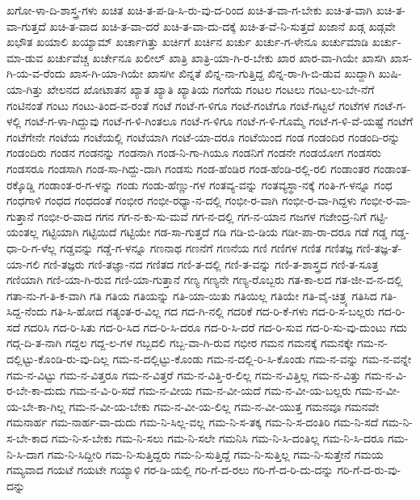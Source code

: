 {ಖಗೋ-ಳಾ-ದಿ-ಶಾಸ್ತ್ರ-ಗಳು
ಖಚಿತ
ಖಚಿ-ತ-ಪ-ಡಿ-ಸಿ-ರು-ವು-ದ-ರಿಂದ
ಖಚಿ-ತ-ವಾ-ಗ-ಬೇಕು
ಖಚಿ-ತ-ವಾಗಿ
ಖಚಿ-ತ-ವಾ-ಗುತ್ತದೆ
ಖಚಿ-ತ-ವಾದ
ಖಚಿ-ತ-ವಾ-ದರೆ
ಖಚಿ-ತ-ವಾ-ದು-ದಕ್ಕೆ
ಖಚಿ-ತ-ವೆ-ನಿ-ಸುತ್ತದೆ
ಖಜಾನೆ
ಖಡ್ಗ
ಖಡ್ಗವೇ
ಖಭೌತ
ಖಯಾಲಿ
ಖಯ್ಯಾಮ್
ಖರ್ಚಾಗಿತ್ತು
ಖರ್ಚಿಗೆ
ಖರ್ಚಿನ
ಖರ್ಚು
ಖರ್ಚು-ಗ-ಳೇನೂ
ಖರ್ಚುಮಾಡಿ
ಖರ್ಚು-ಮಾ-ಡುವ
ಖರ್ಚುವೆಚ್ಚ
ಖರ್ಚೇನೂ
ಖಲೀಲ್
ಖಾತ್ರಿ
ಖಾತ್ರಿ-ಯಾ-ಗಿ-ರ-ಬೇಕು
ಖಾರ
ಖಾರ-ವಾ-ಗಿಯೇ
ಖಾಸಗಿ
ಖಾಸ-ಗಿ-ಯ-ವ-ರೆಂದು
ಖಾಸ-ಗಿ-ಯಾ-ಗಿಯೇ
ಖಾಸಗೀ
ಖಿನ್ನತೆ
ಖಿನ್ನ-ನಾ-ಗುತ್ತಿದ್ದ
ಖಿನ್ನ-ರಾ-ಗಿ-ಬಿ-ಡುವ
ಖುದ್ದಾಗಿ
ಖುಷಿ-ಯಾ-ಗಿತ್ತು
ಖೇಲನದ
ಖೋಟಾತನ
ಖ್ಯಾತ
ಖ್ಯಾತಿ
ಖ್ಯಾತಿಯ
ಗಂಗೆಯ
ಗಂಟಲ
ಗಂಟಲು
ಗಂಟ-ಲು-ಬೇ-ನೆಗೆ
ಗಂಟಿನಂತೆ
ಗಂಟು
ಗಂಟು-ತಿಂದ-ವ-ರಂತೆ
ಗಂಟೆ
ಗಂಟೆ-ಗ-ಳಿಗೂ
ಗಂಟೆ-ಗಂಟೆಗೂ
ಗಂಟೆ-ಗಟ್ಟಲೆ
ಗಂಟೆಗಳ
ಗಂಟೆ-ಗ-ಳಲ್ಲಿ
ಗಂಟೆ-ಗ-ಳಾ-ಗಿದ್ದುವು
ಗಂಟೆ-ಗ-ಳಿ-ಗಿಂತಲೂ
ಗಂಟೆ-ಗ-ಳಿಗೂ
ಗಂಟೆ-ಗ-ಳಿ-ಗೊಮ್ಮೆ
ಗಂಟೆ-ಗ-ಳಿ-ವೆ-ಯಷ್ಟೆ
ಗಂಟೆಗೆ
ಗಂಟೆಗೇನೇ
ಗಂಟೆಯ
ಗಂಟೆಯಲ್ಲಿ
ಗಂಟೆಯಾಗಿ
ಗಂಟೆ-ಯಾ-ದರೂ
ಗಂಟೆಯಿಂದ
ಗಂಡ
ಗಂಡಂದಿರ
ಗಂಡಂದಿ-ರನ್ನು
ಗಂಡಂದಿರು
ಗಂಡನ
ಗಂಡನನ್ನು
ಗಂಡನಾಗಿ
ಗಂಡ-ನಿ-ಗಾ-ಗಿಯೂ
ಗಂಡನಿಗೆ
ಗಂಡನೇ
ಗಂಡಯೋಗ
ಗಂಡಸರು
ಗಂಡಸರೂ
ಗಂಡಸಾಗಿ
ಗಂಡ-ಸಾ-ಗಿದ್ದು-ದಾಗಿ
ಗಂಡಸು
ಗಂಡ-ಹೆಂಡಿರ
ಗಂಡ-ಹೆಂಡಿ-ರಲ್ಲಿ-ರಲಿ
ಗಂಡಾಂತರ
ಗಂಡಾಂತ-ರಕ್ಕೊಡ್ಡಿ
ಗಂಡಾಂತ-ರ-ಗ-ಳನ್ನು
ಗಂಡು
ಗಂಡು-ಹೆಣ್ಣು-ಗಳ
ಗಂತವ್ಯ-ವನ್ನು
ಗಂತವ್ಯಸ್ಥಾ-ನಕ್ಕೆ
ಗಂತಿ-ಗ-ಳನ್ನೂ
ಗಂಧ
ಗಂಧಗಾಳಿ
ಗಂಧದ
ಗಂಧದಂತೆ
ಗಂಭೀರ
ಗಂಭೀ-ರಧ್ಯಾ-ನ-ದಲ್ಲಿ
ಗಂಭೀ-ರ-ವಾಗಿ
ಗಂಭೀ-ರ-ವಾ-ಗಿದ್ದಳು
ಗಂಭೀ-ರ-ವಾ-ಗುತ್ತಾನೆ
ಗಂಭೀ-ರ-ವಾದ
ಗಗನ
ಗಗ-ನ-ಕು-ಸು-ಮವೆ
ಗಗ-ನ-ದಲ್ಲಿ
ಗಗ-ನ-ಯಾನ
ಗಜಗಳ
ಗಜೇಂದ್ರ-ನಿಗೆ
ಗಟ್ಟಿ-ಯಂತಲ್ಲ
ಗಟ್ಟಿಯಾಗಿ
ಗಟ್ಟಿಯಿದೆ
ಗಟ್ಟಿಯೇ
ಗಡ-ಸಾ-ಗುತ್ತದೆ
ಗಡಿ
ಗಡಿ-ಬಿ-ಡಿಯ
ಗಡೀ-ಪಾ-ರಾ-ದರೂ
ಗಡೆ
ಗಡ್ಡ
ಗಡ್ಡ-ಧಾ-ರಿ-ಗ-ಳೆಲ್ಲ
ಗಡ್ಡವನ್ನು
ಗಡ್ಡೆ-ಗ-ಳನ್ನೂ
ಗಣನಾಥ
ಗಣನೆಗೆ
ಗಣನೆಯ
ಗಣಿ
ಗಣಿಗಳ
ಗಣಿತ
ಗಣಿತಜ್ಞ
ಗಣಿ-ತಜ್ಞ-ತೆ-ಯಾ-ಗಲಿ
ಗಣಿ-ತಜ್ಞರು
ಗಣಿ-ತಜ್ಞಾ-ನದ
ಗಣಿತದ
ಗಣಿ-ತ-ದಲ್ಲಿ
ಗಣಿ-ತ-ವನ್ನು
ಗಣಿ-ತ-ಶಾಸ್ತ್ರದ
ಗಣಿ-ತ-ಸೂತ್ರ
ಗಣಿಯಾಗಿ
ಗಣಿ-ಯಾ-ಗಿ-ರುವ
ಗಣಿ-ಯಾ-ಗುತ್ತಾನೆ
ಗಣ್ಯ
ಗಣ್ಯನೇ
ಗಣ್ಯ-ರೊಬ್ಬರು
ಗತ-ಕಾ-ಲದ
ಗತ-ಜೀ-ವ-ನ-ದಲ್ಲಿ
ಗತಾ-ನು-ಗ-ತಿ-ಕ-ವಾಗಿ
ಗತಿ
ಗತಿಯ
ಗತಿಯನ್ನು
ಗತಿ-ಯಾ-ಯಿತು
ಗತಿಯಿಲ್ಲ
ಗತಿಯೇ
ಗತಿ-ವೈ-ಚಿತ್ರ್ಯ
ಗತಿಸಿದ
ಗತಿ-ಸಿದ್ದ-ನೆಂದು
ಗತಿ-ಸಿ-ಹೋದ
ಗತ್ಯಂತ-ರ-ವಿಲ್ಲ
ಗದ
ಗದ-ಗಿ-ನಲ್ಲಿ
ಗದರಿಕೆ
ಗದ-ರಿ-ಕೆ-ಗಳು
ಗದ-ರಿ-ಸ-ಬಲ್ಲರು
ಗದ-ರಿ-ಸದೆ
ಗದರಿಸಿ
ಗದ-ರಿ-ಸಿತು
ಗದ-ರಿ-ಸಿದ
ಗದ-ರಿ-ಸಿ-ದರೂ
ಗದ-ರಿ-ಸಿ-ದರೆ
ಗದ-ರಿ-ಸುವ
ಗದ-ರಿ-ಸು-ವು-ದುಂಟು
ಗದು
ಗದ್ಗ-ದಿ-ತ-ನಾಗಿ
ಗದ್ದಲ
ಗದ್ದ-ಲ-ಗಳ
ಗಬ್ಬದಲಿ
ಗಬ್ಬ-ವಾ-ಗಿ-ರುವ
ಗಭೀರ
ಗಮನ
ಗಮನಕ್ಕೆ
ಗಮನಕ್ಕೇ
ಗಮ-ನ-ದಲ್ಲಿಟ್ಟು-ಕೊಂಡಿ-ರು-ವು-ದಿಲ್ಲ
ಗಮ-ನ-ದಲ್ಲಿಟ್ಟು-ಕೊಂಡು
ಗಮ-ನ-ದಲ್ಲಿ-ರಿ-ಸಿ-ಕೊಂಡು
ಗಮ-ನ-ವನ್ನು
ಗಮ-ನ-ವನ್ನೇ
ಗಮ-ನ-ವಿಟ್ಟು
ಗಮ-ನ-ವಿತ್ತರೂ
ಗಮ-ನ-ವಿತ್ತರೆ
ಗಮ-ನ-ವಿತ್ತಿ-ರ-ಲಿಲ್ಲ
ಗಮ-ನ-ವಿತ್ತಿಲ್ಲ
ಗಮ-ನ-ವಿತ್ತು
ಗಮ-ನ-ವಿ-ರ-ಬೇ-ಕಾ-ದುದು
ಗಮ-ನ-ವಿ-ರಿ-ಸದೆ
ಗಮ-ನ-ವೀಯ
ಗಮ-ನ-ವೀ-ಯದೆ
ಗಮ-ನ-ವೀ-ಯ-ಬಲ್ಲರು
ಗಮ-ನ-ವೀ-ಯ-ಬೇ-ಕಾ-ಗಿಲ್ಲ
ಗಮ-ನ-ವೀ-ಯ-ಬೇಕು
ಗಮ-ನ-ವೀ-ಯ-ಲಿಲ್ಲ
ಗಮ-ನ-ವೀ-ಯುತ್ತ
ಗಮನವೂ
ಗಮನವೇ
ಗಮನಾರ್ಹ
ಗಮ-ನಾರ್ಹ-ವಾ-ದುದು
ಗಮ-ನಿ-ಸಿಲ್ಲ-ವಲ್ಲ
ಗಮ-ನಿ-ಸ-ತಕ್ಕ
ಗಮ-ನಿ-ಸ-ದಂತಿರಿ
ಗಮ-ನಿ-ಸದೆ
ಗಮ-ನಿ-ಸ-ಬೇ-ಕಾದ
ಗಮ-ನಿ-ಸ-ಬೇಕು
ಗಮ-ನಿ-ಸಲು
ಗಮ-ನಿ-ಸಲೇ
ಗಮನಿಸಿ
ಗಮ-ನಿ-ಸಿ-ದಂತಿಲ್ಲ
ಗಮ-ನಿ-ಸಿ-ದರೂ
ಗಮ-ನಿ-ಸಿ-ದಾಗ
ಗಮ-ನಿ-ಸಿದ್ದೀರಿ
ಗಮ-ನಿ-ಸುತ್ತಿದ್ದರು
ಗಮ-ನಿ-ಸುತ್ತಿದ್ದೆ
ಗಮ-ನಿ-ಸುತ್ತಿಲ್ಲ
ಗಮ-ನಿ-ಸುತ್ತೇನೆ
ಗಮಯ
ಗಮ್ಯವಾದ
ಗಯಟೆ
ಗಯಟೇ
ಗಯ್ಯಾಳಿ
ಗರ-ಡಿ-ಯಲ್ಲಿ
ಗರಿ-ಗೆ-ದ-ರಲು
ಗರಿ-ಗೆ-ದ-ರಿ-ದು-ದನ್ನು
ಗರಿ-ಗೆ-ದ-ರು-ವು-ದನ್ನು
}
